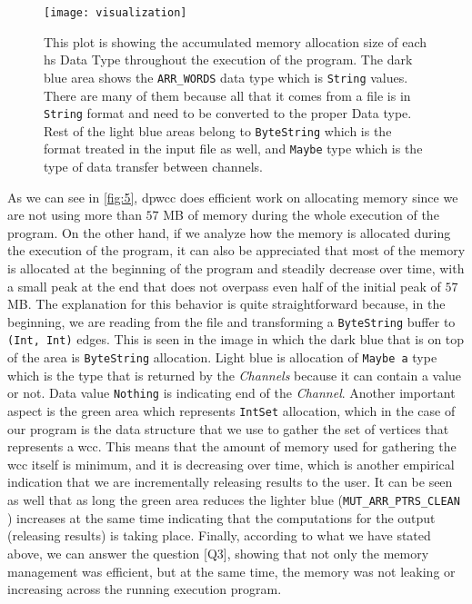 \begin{figure}[!htb]
  \centering
  \texttt{[image: visualization]}
  \caption[{[PoC] Memory Metrics: Allocation by Data Type}]{This plot is showing the accumulated memory allocation size of each \acrshort{hs} Data Type throughout the execution of the program. The dark blue area shows the \texttt{ARR\_WORDS} data type which is \texttt{String} values. There are many of them because all that it comes from a file is in \texttt{String} format and need to be converted to the proper Data type. Rest of the light blue areas belong to \texttt{ByteString} which is the format treated in the input file as well, and \texttt{Maybe} type which is the type of data transfer between channels.}
  \label{fig:5}
\end{figure}

As we can see in \autoref{fig:5}, \acrshort{dpwcc} does efficient work on allocating memory since we are not using more than $57$ MB of memory during the whole execution of the program.
On the other hand, if we analyze how the memory is allocated during the execution of the program, it can also be appreciated that most of the memory is allocated at the beginning of the program and steadily decrease over time, with a small peak at the end that does not overpass even half of the initial peak of $57$ MB. 
The explanation for this behavior is quite straightforward because, in the beginning, we are reading from the file and transforming a \texttt{ByteString} buffer to \texttt{(Int, Int)} edges. 
This is seen in the image in which the dark blue that is on top of the area is \texttt{ByteString} allocation. 
Light blue is allocation of \texttt{Maybe a} type which is the type that is returned by the \textit{Channels} because it can contain a value or not. 
Data value \texttt{Nothing} is indicating end of the \textit{Channel}. 
Another important aspect is the green area which represents \texttt{IntSet} allocation, which in the case of our program is the data structure that we use to gather the set of vertices that represents a \acrshort{wcc}. 
This means that the amount of memory used for gathering the \acrshort{wcc} itself is minimum, and it is decreasing over time, which is another empirical indication that we are incrementally releasing results to the user. 
It can be seen as well that as long the green area reduces the lighter blue (\texttt{MUT\_ARR\_PTRS\_CLEAN} \cite{ghcheap}) increases at the same time indicating that the computations for the output (releasing results) is taking place. 
Finally, according to what we have stated above, we can answer the question [Q3], showing that not only the memory management was efficient, but at the same time, the memory was not leaking or increasing across the running execution program.

